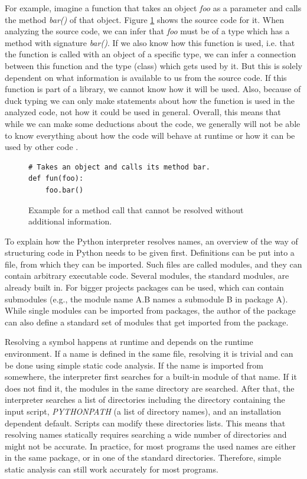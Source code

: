 \documentclass[a4paper,11pt,twoside]{article}
\theoremstyle{definition} %
\renewcommand{\cite}[1]{\citep{#1}}
\begin{document}
For example, imagine a function that takes an object \textit{foo} as a parameter and calls the method \textit{bar()} of that object. Figure \ref{figure:exDuckTyping} shows the source code for it. When analyzing the source code, we can infer that \textit{foo} must be of a type which has a method with signature \textit{bar()}. If we also know how this function is used, i.e. that the function is called with an object of a specific type, we can infer a connection between this function and the type (class) which gets used by it. But this is solely dependent on what information is available to us from the source code. If this function is part of a library, we cannot know how it will be used. Also, because of duck typing we can only make statements about how the function is used in the analyzed code, not how it could be used in general. Overall, this means that while we can make some deductions about the code, we generally will not be able to know everything about how the code will behave at runtime or how it can be used by other code \cite{python-software-foundation-2022}.

\begin{figure}[h]
    \begin{lstlisting}
# Takes an object and calls its method bar.
def fun(foo):
    foo.bar()
    \end{lstlisting}
    \caption{Example for a method call that cannot be resolved without additional information.}
    \label{figure:exDuckTyping}
\end{figure}

To explain how the Python interpreter resolves names, an overview of the way of structuring code in Python needs to be given first. Definitions can be put into a file, from which they can be imported. Such files are called modules, and they can contain arbitrary executable code. Several modules, the standard modules, are already built in. For bigger projects packages can be used, which can contain submodules (e.g., the module name A.B names a submodule B in package A). While single modules can be imported from packages, the author of the package can also define a standard set of modules that get imported from the package. 

Resolving a symbol happens at runtime and depends on the runtime environment. If a name is defined in the same file, resolving it is trivial and can be done using simple static code analysis. If the name is imported from somewhere, the interpreter first searches for a built-in module of that name. If it does not find it, the modules in the same directory are searched. After that, the interpreter searches a list of directories including the directory containing the input script, \textit{PYTHONPATH} (a list of directory names), and an installation dependent default. Scripts can modify these directories lists. This means that resolving names statically requires searching a wide number of directories and might not be accurate. In practice, for most programs the used names are either in the same package, or in one of the standard directories. Therefore, simple static analysis can still work accurately for most programs. 
\end{document}
